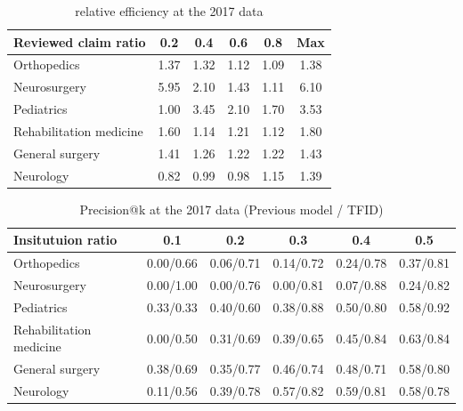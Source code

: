 \documentclass[11pt]{article}           %
\begin{document}
\begin{table}[]
    \centering
    \caption{relative efficiency at the 2017 data}
    \vspace{0.5cm}
    \label{table: relative efficiency 3}
    \begin{tabular}{@{}lccccc@{}}
    \toprule
    Reviewed claim ratio    & 0.2  & 0.4  & 0.6  & 0.8  & Max  \\ \midrule
    Orthopedics             & 1.37 & 1.32 & 1.12 & 1.09 & 1.38 \\
    Neurosurgery            & 5.95 & 2.10 & 1.43 & 1.11 & 6.10 \\
    Pediatrics              & 1.00 & 3.45 & 2.10 & 1.70 & 3.53 \\
    Rehabilitation medicine & 1.60 & 1.14 & 1.21 & 1.12 & 1.80 \\
    General surgery         & 1.41 & 1.26 & 1.22 & 1.22 & 1.43 \\
    Neurology               & 0.82 & 0.99 & 0.98 & 1.15 & 1.39 \\ \bottomrule
    \end{tabular}
\end{table}

\begin{table}[]
    \centering
    \caption{Precision@k at the 2017 data (Previous model / TFID)}
    \vspace{0.5cm}
    \label{table: precision@k 3}
    \begin{tabular}{@{}lccccc@{}}
    \toprule
    Insitutuion ratio       & 0.1       & 0.2       & 0.3       & 0.4       & 0.5       \\ \midrule
    Orthopedics             & 0.00/0.66 & 0.06/0.71 & 0.14/0.72 & 0.24/0.78 & 0.37/0.81 \\
    Neurosurgery            & 0.00/1.00 & 0.00/0.76 & 0.00/0.81 & 0.07/0.88 & 0.24/0.82 \\
    Pediatrics              & 0.33/0.33 & 0.40/0.60 & 0.38/0.88 & 0.50/0.80 & 0.58/0.92 \\
    Rehabilitation medicine & 0.00/0.50 & 0.31/0.69 & 0.39/0.65 & 0.45/0.84 & 0.63/0.84 \\
    General surgery         & 0.38/0.69 & 0.35/0.77 & 0.46/0.74 & 0.48/0.71 & 0.58/0.80 \\
    Neurology               & 0.11/0.56 & 0.39/0.78 & 0.57/0.82 & 0.59/0.81 & 0.58/0.78 \\ \bottomrule
    \end{tabular}
\end{table}
\end{document}
